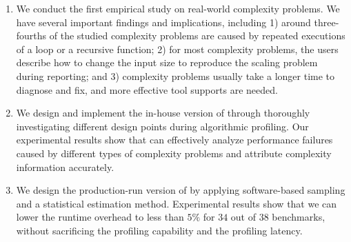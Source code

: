 \begin{enumerate}

\item We conduct the first empirical study on real-world complexity problems.
We have several important findings and implications, including
1) around three-fourths of the studied complexity problems are
caused by repeated executions of a loop or a recursive function;
2) for most complexity problems,
the users describe how to change the input size to reproduce the scaling problem during reporting;
and 3) complexity problems usually take a longer time to diagnose and fix,
and more effective tool supports are needed.

\item We design and implement the in-house version of \Tool through
thoroughly investigating different design points during algorithmic profiling.
Our experimental results show that \Tool can effectively analyze performance failures
caused by different types of complexity problems and attribute complexity information accurately.

\item We design the production-run version of \Tool by applying
software-based sampling and a statistical estimation method.
Experimental results show that we can lower the runtime overhead to less than
$5\%$ for $34$ out of $38$ benchmarks,
without sacrificing the profiling capability and the profiling latency.

\end{enumerate}
